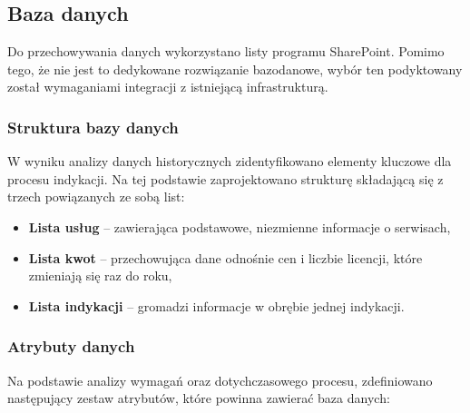 \subsection{Baza danych}

Do przechowywania danych wykorzystano listy programu SharePoint. Pomimo tego, że nie jest to dedykowane rozwiązanie bazodanowe, wybór ten podyktowany został wymaganiami integracji z istniejącą infrastrukturą.

\subsubsection{Struktura bazy danych}
\label{Subsec: StrukturaBazyDanych}
W wyniku analizy danych historycznych zidentyfikowano elementy kluczowe dla procesu indykacji. Na tej podstawie zaprojektowano strukturę składającą się z trzech powiązanych ze sobą list:

\begin{itemize}
  \item \textbf{Lista usług} -- zawierająca podstawowe, niezmienne informacje o serwisach,
  \item \textbf{Lista kwot} -- przechowująca dane odnośnie cen i liczbie licencji, które zmieniają się raz do roku,
  \item \textbf{Lista indykacji} -- gromadzi informacje w obrębie jednej indykacji.
\end{itemize}
\subsubsection{Atrybuty danych}
Na podstawie analizy wymagań oraz dotychczasowego procesu, zdefiniowano następujący zestaw atrybutów, które powinna zawierać baza danych:

